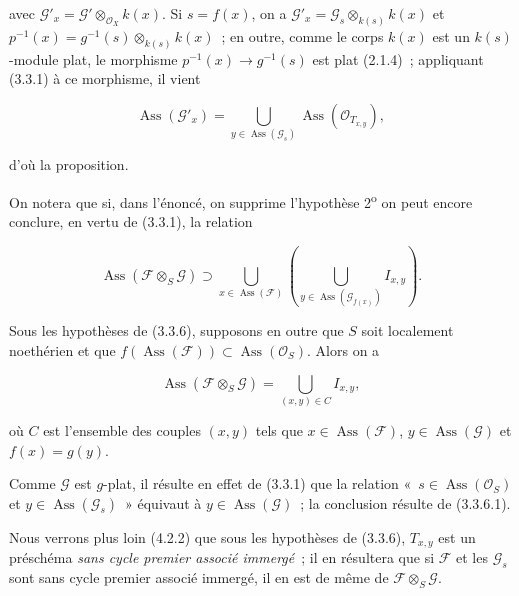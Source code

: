 avec $\mathcal G'_x=\mathcal G'\otimes_{\mathcal O_X}k(x)$. Si $s=f(x)$, on a
$\mathcal G'_x=\mathcal G_s\otimes_{k(s)}k(x)$ et
$p^{-1}(x)=g^{-1}(s)\otimes_{k(s)}k(x)$~; en outre, comme le corps $k(x)$ est
un $k(s)$-module plat, le morphisme
$p^{-1}(x)\to g^{-1}(s)$ est plat (2.1.4)~; appliquant (3.3.1) à ce morphisme,
il vient

\begin{env}[3.3.6.3]
\label{IV.2.3.3.6.3-fr}
\[
\operatorname{Ass}(\mathcal G'_x)
=\bigcup_{y\in\operatorname{Ass}(\mathcal G_s)}
\operatorname{Ass}(\mathcal O_{T_{x,y}}),
\]
\end{env}

d'où la proposition.

On notera que si, dans l'énoncé, on supprime l'hypothèse
2\textsuperscript{o} on peut encore conclure, en vertu de (3.3.1), la relation

\begin{env}[3.3.6.4]
\label{IV.2.3.3.6.4-fr}
\[
\operatorname{Ass}(\mathcal F\otimes_S\mathcal G)
\supset\bigcup_{x\in\operatorname{Ass}(\mathcal F)}
\left(\bigcup_{y\in\operatorname{Ass}(\mathcal G_{f(x)})}I_{x,y}\right).
\]
\end{env}

\begin{corollary}[3.3.7]
\label{IV.2.3.3.7-fr}
Sous les hypothèses de (3.3.6), supposons en outre que $S$ soit localement
noethérien et que
$f(\operatorname{Ass}(\mathcal F))\subset\operatorname{Ass}(\mathcal O_S)$.
Alors on a
\end{corollary}

\begin{env}[3.3.7.1]
\label{IV.2.3.3.7.1-fr}
\[
\operatorname{Ass}(\mathcal F\otimes_S\mathcal G)
=\bigcup_{(x,y)\in C}I_{x,y},
\]
\end{env}

où $C$ est l'ensemble des couples $(x,y)$ tels que
$x\in\operatorname{Ass}(\mathcal F)$, $y\in\operatorname{Ass}(\mathcal G)$ et
$f(x)=g(y)$.

Comme $\mathcal G$ est $g$-plat, il résulte en effet de (3.3.1) que la relation
«~$s\in\operatorname{Ass}(\mathcal O_S)$ et
$y\in\operatorname{Ass}(\mathcal G_s)$~» équivaut à
$y\in\operatorname{Ass}(\mathcal G)$~; la conclusion résulte de (3.3.6.1).

\begin{remark}[3.3.8]
\label{IV.2.3.3.8-fr}
Nous verrons plus loin (4.2.2) que sous les hypothèses de (3.3.6),
$T_{x,y}$ est un préschéma \emph{sans cycle premier associé immergé}~; il en
résultera que si $\mathcal F$ et les $\mathcal G_s$ sont sans cycle premier
associé immergé, il en est de même de $\mathcal F\otimes_S\mathcal G$.
\end{remark}

